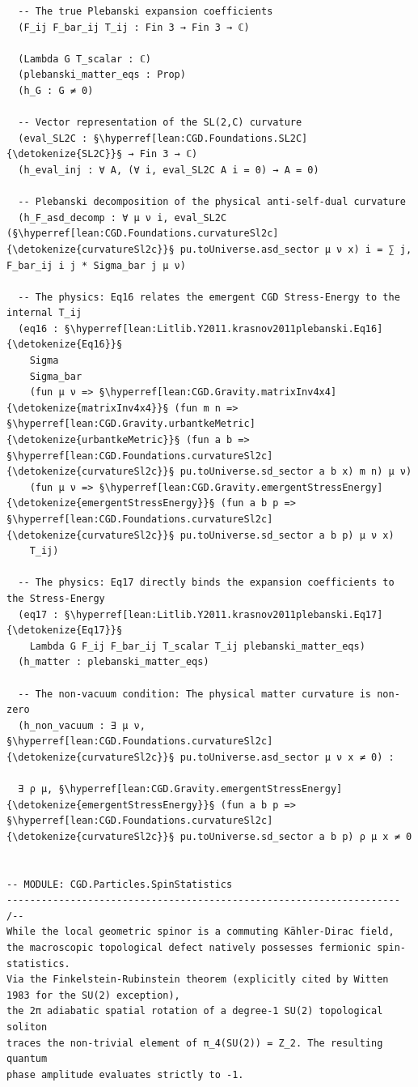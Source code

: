 \begin{verbatim}
  -- The true Plebanski expansion coefficients
  (F_ij F_bar_ij T_ij : Fin 3 → Fin 3 → ℂ)

  (Lambda G T_scalar : ℂ)
  (plebanski_matter_eqs : Prop)
  (h_G : G ≠ 0)

  -- Vector representation of the SL(2,C) curvature
  (eval_SL2C : §\hyperref[lean:CGD.Foundations.SL2C]{\detokenize{SL2C}}§ → Fin 3 → ℂ)
  (h_eval_inj : ∀ A, (∀ i, eval_SL2C A i = 0) → A = 0)

  -- Plebanski decomposition of the physical anti-self-dual curvature
  (h_F_asd_decomp : ∀ μ ν i, eval_SL2C (§\hyperref[lean:CGD.Foundations.curvatureSl2c]{\detokenize{curvatureSl2c}}§ pu.toUniverse.asd_sector μ ν x) i = ∑ j, F_bar_ij i j * Sigma_bar j μ ν)

  -- The physics: Eq16 relates the emergent CGD Stress-Energy to the internal T_ij
  (eq16 : §\hyperref[lean:Litlib.Y2011.krasnov2011plebanski.Eq16]{\detokenize{Eq16}}§
    Sigma
    Sigma_bar
    (fun μ ν => §\hyperref[lean:CGD.Gravity.matrixInv4x4]{\detokenize{matrixInv4x4}}§ (fun m n => §\hyperref[lean:CGD.Gravity.urbantkeMetric]{\detokenize{urbantkeMetric}}§ (fun a b => §\hyperref[lean:CGD.Foundations.curvatureSl2c]{\detokenize{curvatureSl2c}}§ pu.toUniverse.sd_sector a b x) m n) μ ν)
    (fun μ ν => §\hyperref[lean:CGD.Gravity.emergentStressEnergy]{\detokenize{emergentStressEnergy}}§ (fun a b p => §\hyperref[lean:CGD.Foundations.curvatureSl2c]{\detokenize{curvatureSl2c}}§ pu.toUniverse.sd_sector a b p) μ ν x)
    T_ij)

  -- The physics: Eq17 directly binds the expansion coefficients to the Stress-Energy
  (eq17 : §\hyperref[lean:Litlib.Y2011.krasnov2011plebanski.Eq17]{\detokenize{Eq17}}§
    Lambda G F_ij F_bar_ij T_scalar T_ij plebanski_matter_eqs)
  (h_matter : plebanski_matter_eqs)

  -- The non-vacuum condition: The physical matter curvature is non-zero
  (h_non_vacuum : ∃ μ ν, §\hyperref[lean:CGD.Foundations.curvatureSl2c]{\detokenize{curvatureSl2c}}§ pu.toUniverse.asd_sector μ ν x ≠ 0) :

  ∃ ρ μ, §\hyperref[lean:CGD.Gravity.emergentStressEnergy]{\detokenize{emergentStressEnergy}}§ (fun a b p => §\hyperref[lean:CGD.Foundations.curvatureSl2c]{\detokenize{curvatureSl2c}}§ pu.toUniverse.sd_sector a b p) ρ μ x ≠ 0


-- MODULE: CGD.Particles.SpinStatistics
--------------------------------------------------------------------
/--
While the local geometric spinor is a commuting Kähler-Dirac field, 
the macroscopic topological defect natively possesses fermionic spin-statistics. 
Via the Finkelstein-Rubinstein theorem (explicitly cited by Witten 1983 for the SU(2) exception),
the 2π adiabatic spatial rotation of a degree-1 SU(2) topological soliton 
traces the non-trivial element of π_4(SU(2)) = Z_2. The resulting quantum 
phase amplitude evaluates strictly to -1.


\end{verbatim}
